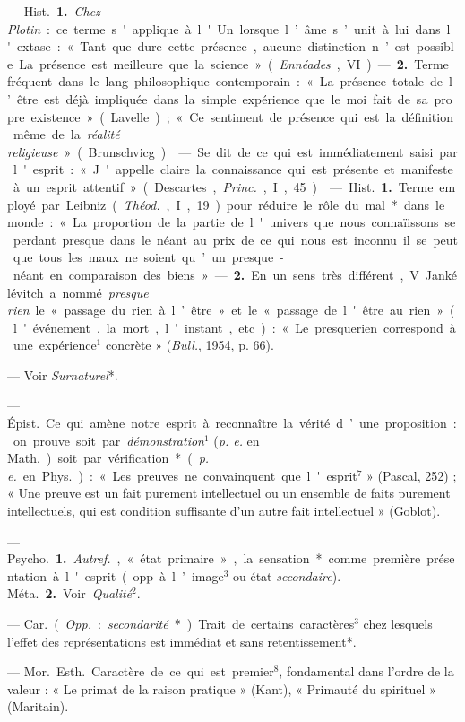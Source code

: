 \begin{itemize}[leftmargin=1cm, label=, itemsep=1pt]
 — \si{Hist.} {\bf 1.} {\it Chez Plotin} : ce
terme s'applique à l'Un lorsque
l’âme s’unit à lui dans l'extase : « Tant que dure cette présence, aucune
distinction n’est possible... La présence est meilleure que la science »
({\it Ennéades}, VI). — {\bf 2.} Terme fréquent dans le lang. philosophique
contemporain : « La présence totale de l’être est déjà impliquée dans la
simple expérience que le moi fait de sa propre existence » (Lavelle) ; « Ce
sentiment de présence qui est la définition même de la {\it réalité
religieuse} » (Brunschvicg).

 — Se dit de ce qui est immédiatement saisi par l'esprit : «
J'appelle claire la connaissance qui est présente et manifeste à un esprit
attentif » (Descartes, {\it Princ.}, I, 45).

 — \si{Hist.} {\bf 1.} Terme employé par Leibniz
({\it Théod.}, I, 19) pour réduire le rôle du mal* dans le monde : « La
proportion de la partie de l'univers que nous connaïissons se perdant
presque dans le néant au prix de ce qui nous est inconnu... il se peut que
tous les maux ne soient qu’un presque-néant en comparaison des biens ». —
{\bf 2.} En un sens très différent, V. Jankélévitch a nommé {\it presque
rien} le « passage du rien à l’être » et le « passage de l'être au rien
» (l'événement, la mort, l'instant, etc.) : « Le presquerien correspond à
une expérience$^1$ concrète » ({\it Bull.}, 1954, p. 66).

 — Voir {\it Surnaturel}*.

 — \si{Épist.} Ce qui amène notre esprit à reconnaître la vérité
d’une proposition : on prouve soit par {\it démonstration}$^1$ ({\it p. e.}
en \si{Math.}) soit par vérification* ({\it p. e.} en \si{Phys.}) : « Les
preuves ne convainquent que l'esprit$^7$ » (Pascal, 252) ; « Une preuve est
un fait purement intellectuel ou un ensemble de faits purement
intellectuels, qui est condition suffisante d’un autre fait intellectuel
» (Goblot).

 — \si{Psycho.} {\bf 1.} {\it Autref.}, « état primaire », la
sensation* comme première présentation à l'esprit (opp. à l’image$^3$ ou
état {\it secondaire}). — \si{Méta.} {\bf 2.} Voir {\it Qualité}$^2$.

 — \si{Car.} ({\it Opp.} : {\it secondarité}*). Trait de
certains caractères$^3$ chez lesquels l'effet des représentations est
immédiat et sans retentissement*.

 —  \si{Mor.} \si{Esth.} Caractère de ce
qui est premier$^8$, fondamental dans l’ordre de la valeur : « Le primat de
la raison pratique » (Kant), « Primauté du spirituel » (Maritain).


\end{itemize}
